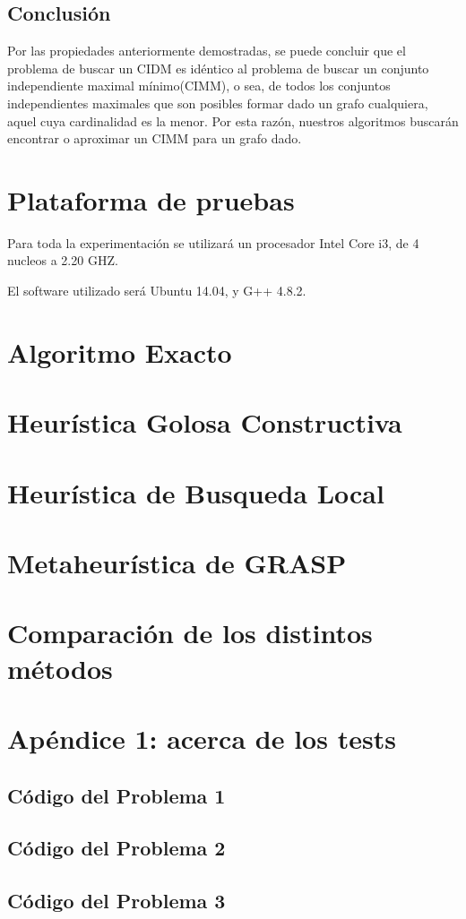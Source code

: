 \documentclass[a4paper]{article}
\begin{document}
\subsection{Conclusión}
Por las propiedades anteriormente demostradas, se puede concluir que el problema de buscar un CIDM es idéntico al problema de buscar un conjunto independiente maximal mínimo(CIMM), o sea, de todos los conjuntos independientes maximales que son posibles formar dado un grafo cualquiera, aquel cuya cardinalidad es la menor. Por esta razón, nuestros algoritmos buscarán encontrar o aproximar un CIMM para un grafo dado.

\section{Plataforma de pruebas}

Para toda la experimentación se utilizará un procesador Intel Core i3, de 4 nucleos a 2.20 GHZ.

El software utilizado será Ubuntu 14.04, y G++ 4.8.2.


\section{Algoritmo Exacto}


\newpage
\section{Heurística Golosa Constructiva}


\newpage
\section{Heurística de Busqueda Local}


\newpage
\section{Metaheurística de GRASP}


\newpage
\section{Comparación de los distintos métodos}


\newpage
\section{Apéndice 1: acerca de los tests}


\subsection{Código del Problema 1}

\subsection{Código del Problema 2}



\subsection{Código del Problema 3}
\end{document}
